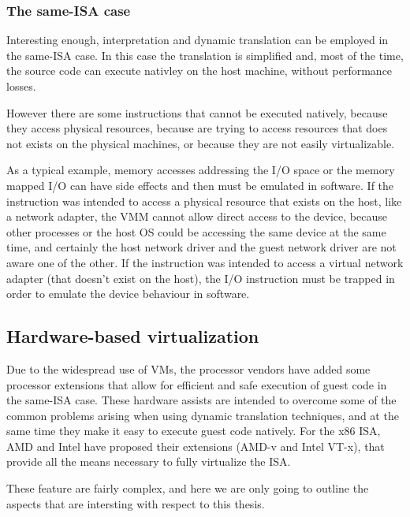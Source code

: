 \subsubsection{The same-ISA case}
\label{sec:sidt}
Interesting enough, interpretation and dynamic translation can be employed in the same-ISA case. In this case the translation is
simplified and, most of the time, the source code can execute nativley on the host machine, without performance losses.

However there are some instructions that cannot be executed natively, because they access physical resources, because
are trying to access resources that does not exists on the physical machines, or because they are not easily virtualizable. %

As a typical example, memory accesses addressing the I/O space or the memory mapped I/O can have side effects and then must be emulated 
in software. If the instruction was intended to access a physical resource that exists on the host, like a network adapter, the VMM 
cannot allow direct access to the device, because other processes or the host OS could be accessing the same device at the same time,
and certainly the host network driver and the guest network driver are not aware one of the other.
If the instruction was intended to access a virtual network adapter (that doesn't exist on the host), the I/O instruction must be trapped
in order to emulate the device behaviour in software.



\subsection{Hardware-based virtualization}
Due to the widespread use of VMs, the processor vendors have added some processor extensions that allow for efficient and safe execution
of guest code in the same-ISA case. These hardware assists are intended to overcome some of the common problems arising when using
dynamic translation techniques, and at the same time they make it easy to execute guest code natively.
For the x86 ISA, AMD and Intel have proposed their extensions (AMD-v and Intel VT-x), that provide all the means necessary to fully
virtualize the ISA.

These feature are fairly complex, and here we are only going to outline the aspects that are intersting with respect to this thesis.

